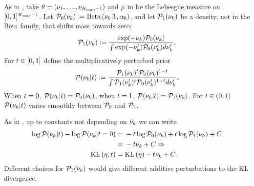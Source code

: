 \begin{ex}
%
As in , take $\theta = (\nu_1, \ldots, \nu_{{K_{\mathrm{max}}}-1})$
and $\mu$ to be the Lebesgue measure on $[0,1]^{{K_{\mathrm{max}}}-1}$. Let $\mathcal{P}_{0}(\nu_{k}) :=
\mathrm{Beta}\left(\nu_{k} \vert 1, \alpha_0\right)$, and let $\mathcal{P}_{1}(\nu_{k})$ be a density, not
in the Beta family, that shifts mass towards zero:
%
\begin{align*}
%
\palt(\nuk) :=
    \frac{\exp(-\nuk)\pbase(\nuk)}{\int \exp(-\nuk')\pbase(\nuk') d\nuk'}.
%
\end{align*}
%
For $t \in [0,1]$ define the multiplicatively perturbed prior
%
\begin{align*}
%
\p(\nuk \vert \t) :=
    \frac{\palt(\nuk)^{\t} \pbase(\nuk)^{1-\t}}
         {\int \palt(\nuk')^{\t} \pbase(\nuk')^{1-\t} d\nuk'}.
%
\end{align*}
%
When $t = 0$, $\mathcal{P}(\nu_{k} \vert t) = \mathcal{P}_{0}(\nu_{k})$, when $t = 1$,
$\mathcal{P}(\nu_{k} \vert t)  = \mathcal{P}_{1}(\nu_{k})$.  For $t \in (0,1)$
$\mathcal{P}(\nu_{k} \vert t)$ varies smoothly between $\mathcal{P}_{0}$ and $\mathcal{P}_{1}$.

As in , up to constants not depending on
$\tilde{\nu}_{k}$ we can write
%
\begin{align*}
%
\log \p(\nuk \vert \t) - \log \p(\nuk \vert \t=0) ={}&
    -\t \log \pbase(\nuk) + \t \log \palt(\nuk) + \const
\\={}& -\t \nuk + \const \Rightarrow
\\
\KL{\eta, \t} ={}& \KL{\eta} -\t \nuk + \const.
%
\end{align*}
%
Different choices for $\mathcal{P}_{1}(\nu_{k})$ would give different additive
perturbations to the KL divergence.
%
\end{ex}
%
